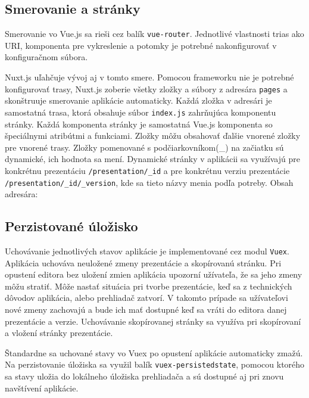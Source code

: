 \subsection{Smerovanie a stránky}
Smerovanie vo Vue.js sa rieši cez balík \texttt{vue-router}. Jednotlivé vlastnosti trias ako URI, komponenta pre vykreslenie a  potomky je potrebné nakonfigurovať v konfiguračnom súbora. 

Nuxt.js uľahčuje vývoj aj v tomto smere. Pomocou frameworku nie je potrebné konfigurovať trasy, Nuxt.js zoberie všetky zložky a súbory z adresára \texttt{pages} a skonštruuje smerovanie aplikácie automaticky. Každá zložka v adresári je samostatná trasa, ktorá obsahuje súbor \texttt{index.js} zahrňujúca komponentu stránky. Každá komponenta stránky je samostatná Vue.js komponenta so špeciálnymi atribútmi a funkciami. Zložky môžu obsahovať ďalšie vnorené zložky pre vnorené trasy. Zložky pomenované s podčiarkovníkom(\_) na začiatku sú dynamické, ich hodnota sa mení. Dynamické stránky v aplikácii sa využívajú pre konkrétnu prezentáciu \texttt{/presentation/\_id} a pre konkrétnu verziu prezentácie \texttt{/presentation/\_id/\_version}, kde sa tieto názvy menia podľa potreby. Obsah adresára:

\vspace{5mm}
\vspace{5mm}

\subsection{Perzistované úložisko}
Uchovávanie jednotlivých stavov aplikácie je implementované cez modul \texttt{Vuex}. Aplikácia uchováva neuložené zmeny prezentácie a skopírovanú stránku. Pri opustení editora bez uložení zmien aplikácia upozorní užívateľa, že sa jeho zmeny môžu stratiť. Môže nastať situácia pri tvorbe prezentácie, keď sa z technických dôvodov aplikácia, alebo prehliadač zatvorí. V takomto prípade sa užívateľovi nové zmeny zachovajú a bude ich mať dostupné keď sa vráti do editora danej prezentácie a verzie. Uchovávanie skopírovanej stránky sa využíva pri skopírovaní a vložení stránky prezentácie. 

Štandardne sa uchované stavy vo Vuex po opustení aplikácie automaticky zmažú. Na perzistovanie úložiska sa využil balík \texttt{vuex-persistedstate}, pomocou ktorého sa stavy uložia do lokálneho úložiska prehliadača a sú dostupné aj pri znovu navštívení aplikácie.

